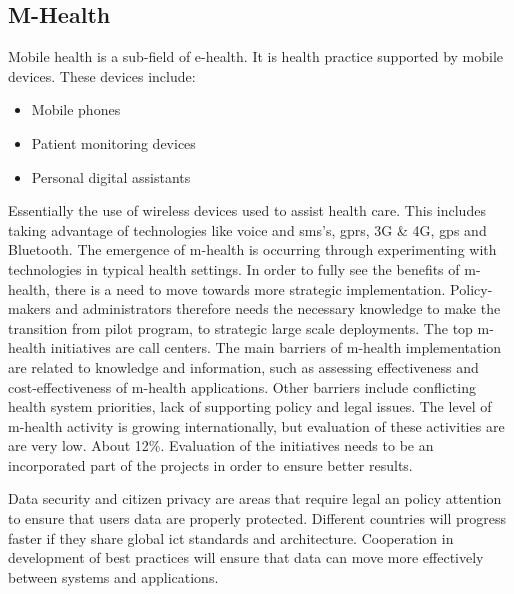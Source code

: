 \subsection{M-Health}
Mobile health is a sub-field of e-health. It is health practice supported by mobile devices.
These devices include:
\begin{itemize}
\item Mobile phones
\item Patient monitoring devices
\item Personal digital assistants
\end{itemize}
Essentially the use of wireless devices used to assist health care.
This includes taking advantage of technologies like voice and \gls{sms}'s, \gls{gprs}, 3G \& 4G, \gls{gps} and Bluetooth.
The emergence of m-health is occurring through experimenting with technologies in typical health settings. 
In order to fully see the benefits of m-health, there is a need to move towards more strategic implementation. Policy-makers and administrators therefore needs the necessary knowledge to make the transition from pilot program, to strategic large scale deployments.
The top m-health initiatives are call centers.
The main barriers of m-health implementation are related to knowledge and information, such as assessing effectiveness and cost-effectiveness of m-health applications.
Other barriers include conflicting health system priorities, lack of supporting policy and legal issues. 
The level of m-health activity is growing internationally, but evaluation of these activities are are very low. About 12\%. 
Evaluation of the initiatives needs to be an incorporated part of the projects in order to ensure better results.

Data security and citizen privacy are areas that require legal an policy attention to ensure that users data are properly protected.
Different countries will progress faster if they share global \gls{ict} standards and architecture. 
Cooperation in development of best practices will ensure that data can move more effectively between systems and applications.
\cite{mhealth:who}

